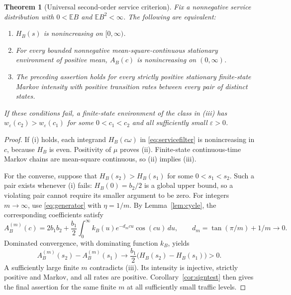 \documentclass[aap,preprint]{imsart}
\numberwithin{equation}{section}
\theoremstyle{plain}
\newtheorem{theorem}{Theorem}[section]
\theoremstyle{definition}
\newcommand{\E}{\mathbb E}
\newcommand{\1}{\mathbf 1}
\newcommand{\eps}{\varepsilon}
\begin{document}
\begin{theorem}[Universal second-order service criterion]\label{thm:servicecriterion}
Fix a nonnegative service distribution with $0<\E B$ and $\E B^2<\infty$. The following are equivalent:
\begin{enumerate}
\item $H_B(s)$ is nonincreasing on $[0,\infty)$.
\item For every bounded nonnegative mean-square-continuous stationary environment of positive mean, $A_B(c)$ is nonincreasing on $(0,\infty)$.
\item The preceding assertion holds for every strictly positive stationary finite-state Markov intensity with positive transition rates between every pair of distinct states.
\end{enumerate}
If these conditions fail, a finite-state environment of the class in (iii) has $w_\eps(c_2)>w_\eps(c_1)$ for some $0<c_1<c_2$ and all sufficiently small $\eps>0$.
\end{theorem}
\begin{proof}
If (i) holds, each integrand $H_B(c\omega)$ in \eqref{eq:servicefilter} is nonincreasing in $c$, because $H_B$ is even. Positivity of $\mu$ proves (ii). Finite-state continuous-time Markov chains are mean-square continuous, so (ii) implies (iii).

For the converse, suppose that $H_B(s_2)>H_B(s_1)$ for some $0<s_1<s_2$. Such a pair exists whenever (i) fails: $H_B(0)=b_2/2$ is a global upper bound, so a violating pair cannot require its smaller argument to be zero. For integers $m\to\infty$, use \eqref{eq:generator} with $\eta=1/m$. By Lemma~\ref{lem:cycle}, the corresponding coefficients satisfy
\[
 A_B^{(m)}(c)=2b_1b_2+\frac{b_1}{2}
       \int_0^\infty k_B(u)e^{-d_mcu}\cos(cu)\,du,
 \qquad d_m=\tan(\pi/m)+1/m\longrightarrow0.
\]
Dominated convergence, with dominating function $k_B$, yields
\[
 A_B^{(m)}(s_2)-A_B^{(m)}(s_1)
 \longrightarrow\frac{b_1}{2}\bigl(H_B(s_2)-H_B(s_1)\bigr)>0.
\]
A sufficiently large finite $m$ contradicts (iii). Its intensity is injective, strictly positive and Markov, and all rates are positive. Corollary~\ref{cor:signtest} then gives the final assertion for the same finite $m$ at all sufficiently small traffic levels.
\end{proof}
\end{document}
